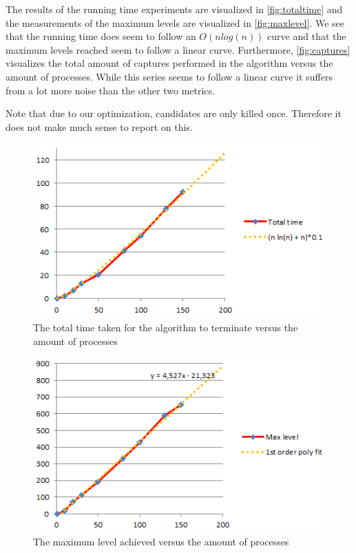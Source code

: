 \documentclass[12pt]{article}
\begin{document}
\quad The results of the running time experiments are visualized in \autoref{fig:totaltime} and the measurements of the
maximum levels are visualized in \autoref{fig:maxlevel}. We see that the running time does seem to follow an $O(n log(n))$ curve
and that the maximum levels reached seem to follow a linear curve.
Furthermore, \autoref{fig:captures} visualizes the total amount of captures performed in the algorithm versus the amount of
processes. While this series seems to follow a linear curve it suffers from a lot more noise than the other two metrics.

\quad Note that due to our optimization, candidates are only killed once. Therefore it does not make much sense to report on this.

\begin{figure}[h]
    \centering
    \includegraphics{totaltime.png}
    \caption{The total time taken for the algorithm to terminate versus the amount of processes}
    \label{fig:totaltime}
\end{figure}

\begin{figure}[p]
    \centering
    \includegraphics{maxlevel.png}
    \caption{The maximum level achieved versus the amount of processes}
    \label{fig:maxlevel}
\end{figure}
\end{document}
